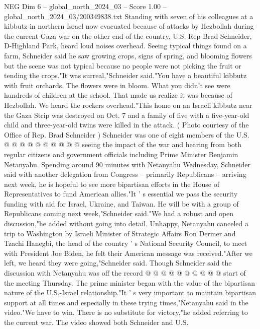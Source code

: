 \begin{textsample}{NEG Dim 6 – global\_north\_2024\_03 – Score 1.00 – global\_north\_2024\_03/200349838.txt}  \label{ex:f6_neg_396}
Standing with seven of his colleagues at a kibbutz in northern Israel now evacuated because of attacks by Hezbollah during the current Gaza war on the other end of the country, U.S.
Rep Brad Schneider, D-Highland Park, heard loud noises overhead.
Seeing typical things found on a farm, Schneider said he saw growing crops, signs of spring, and blooming flowers but the scene was not typical because no people were not picking the fruit or tending the crops."It was surreal,"Schneider said."You have a beautiful kibbutz with fruit orchards.
The flowers were in bloom.
What you didn't see were hundreds of children at the school.
That made us realize it was because of Hezbollah.
We heard the rockers overhead."This home on an Israeli kibbutz near the Gaza Strip was destroyed on Oct. 7 and a family of five with a five-year-old child and three-year-old twins were killed in the attack. ( Photo courtesy of the Office of Rep.
Brad Schneider ) Schneider was one of eight members of the U.S. @ @ @ @ @ @ @ @ @ @ seeing the impact of the war and hearing from both regular citizens and government officials including Prime Minister Benjamin Netanyahu.
Spending around 90 minutes with Netanyahu Wednesday, Schneider said with another delegation from Congress -- primarily Republicans -- arriving next week, he is hopeful to see more bipartisan efforts in the House of Representatives to fund American allies."It ' s essential we pass the security funding with aid for Israel, Ukraine, and Taiwan.
He will be with a group of Republicans coming next week,"Schneider said."We had a robust and open discussion,"he added without going into detail.
Unhappy, Netanyahu canceled a trip to Washington by Israeli Minister of Strategic Affairs Ron Dermer and Tzachi Hanegbi, the head of the country ' s National Security Council, to meet with President Joe Biden, he felt their American message was received."After we left, we heard they were going,"Schneider said.
Though Schneider said the discussion with Netanyahu was off the record @ @ @ @ @ @ @ @ @ @ start of the meeting Thursday.
The prime minister began with the value of the bipartisan nature of the U.S.-Israel relationship."It ' s very important to maintain bipartisan support at all times and especially in these trying times,"Netanyahu said in the video."We have to win.
There is no substitute for victory,"he added referring to the current war.
The video showed both Schneider and U.S.

\end{textsample}
